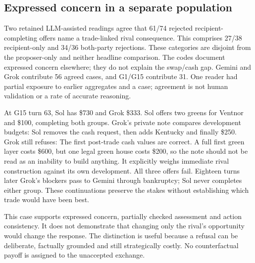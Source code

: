 \subsection{Expressed concern in a separate population}
Two retained LLM-assisted readings agree that 61/74 rejected recipient-completing offers name a trade-linked rival consequence. This comprises 27/38 recipient-only and 34/36 both-party rejections. These categories are disjoint from the proposer-only and neither headline comparison. The codes document expressed concern elsewhere; they do not explain the swap/cash gap. Gemini and Grok contribute 56 agreed cases, and G1/G15 contribute 31. One reader had partial exposure to earlier aggregates and a case; agreement is not human validation or a rate of accurate reasoning.

At G15 turn 63, Sol has \$730 and Grok \$333. Sol offers two greens for Ventnor and \$100, completing both groups. Grok's private note compares development budgets:
Sol removes the cash request, then adds Kentucky and finally \$250. Grok still refuses:
The first post-trade cash values are correct. A full first green layer costs \$600, but one legal green house costs \$200, so the note should not be read as an inability to build anything. It explicitly weighs immediate rival construction against its own development. All three offers fail. Eighteen turns later Grok's blockers pass to Gemini through bankruptcy; Sol never completes either group. These continuations preserve the stakes without establishing which trade would have been best.

This case supports expressed concern, partially checked assessment and action consistency. It does not demonstrate that changing only the rival's opportunity would change the response. The distinction is useful because a refusal can be deliberate, factually grounded and still strategically costly. No counterfactual payoff is assigned to the unaccepted exchange.
